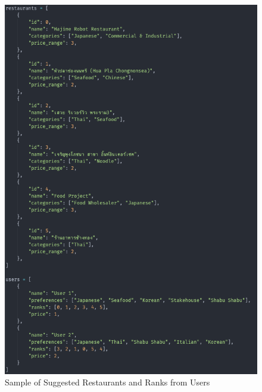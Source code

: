 \documentclass[12pt,oneside,openright,a4paper]{cpe-english-project}
\begin{document}
\begin{figure}[H]\centering
\includegraphics[width=400pt]{./images/4SampleofSuggestedRestaurantsandRanksfromUsers.png}
\caption{Sample of Suggested Restaurants and Ranks from Users}\label{fig:4SampleofSuggestedRestaurantsandRanksfromUsers}
\end{figure}\vspace{-24pt}
\end{document}
